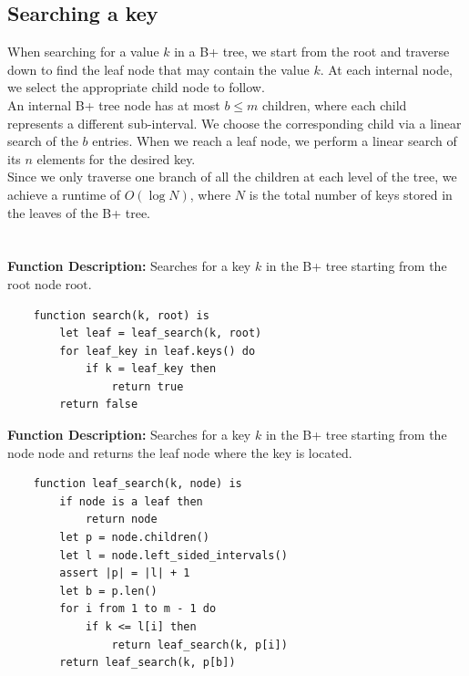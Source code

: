 \documentclass{article}
\begin{document}
    \subsection{Searching a key}
    When searching for a value \( k \) in a B+ tree, we start from the root and traverse down to find the leaf node that may contain the value \( k \). At each internal node, we select the appropriate child node to follow.\\ 

   An internal B+ tree node has at most \( b \leq m \) children, where each child represents a different sub-interval. We choose the corresponding child via a linear search of the \( b \) entries. When we reach a leaf node, we perform a linear search of its \( n \) elements for the desired key.\\
 
   Since we only traverse one branch of all the children at each level of the tree, we achieve a runtime of \( O(\log N) \), where \( N \) is the total number of keys stored in the leaves of the B+ tree.\\ \\ \\
    \textbf{Function Description:} Searches for a key \( k \) in the B+ tree starting from the root node \( \text{root} \).

    \begin{verbatim}
    function search(k, root) is
        let leaf = leaf_search(k, root)
        for leaf_key in leaf.keys() do
            if k = leaf_key then
                return true
        return false
    \end{verbatim}
    \textbf{Function Description:} Searches for a key \( k \) in the B+ tree starting from the node \( \text{node} \) and returns the leaf node where the key is located.

    \begin{verbatim}
    function leaf_search(k, node) is
        if node is a leaf then
            return node
        let p = node.children()
        let l = node.left_sided_intervals()
        assert |p| = |l| + 1
        let b = p.len()
        for i from 1 to m - 1 do
            if k <= l[i] then
                return leaf_search(k, p[i])
        return leaf_search(k, p[b])
    \end{verbatim}
\end{document}
